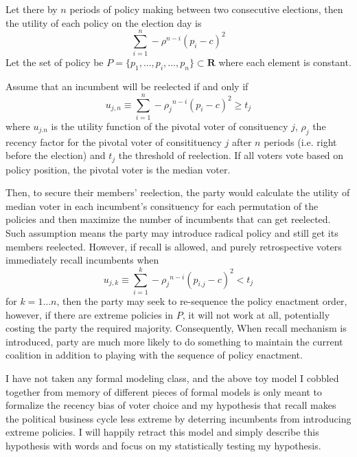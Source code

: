 \documentclass[hyphens, crop=false]{standalone}
\begin{document}
	Let there by $n$ periods of policy making between two consecutive elections, then the utility of each policy on the election day is
	$$
	\sum_{i = 1}^{n} -\rho^{n-i}( p_i-c)^2
	$$
	Let the set of policy be $P = \{p_1, \dots, p_i, \dots, p_n\}\subset \mathbf{R}$ where each element is constant.
	
	Assume that an incumbent will be reelected if and only if 
	$$
	u_{j, n} \equiv \sum_{i = 1}^{n} -{\rho_j}^{n-i}( p_{i}-c)^2 \geq t_j 
	$$
	where $u_{j.n}$ is the utility function of the pivotal voter of consituency $j$,
	$\rho_j$ the recency factor for the pivotal voter of consitituency $j$
	after $n$ periods (i.e. right before the election) and $t_j$ the threshold of reelection. If all voters vote based on policy position, the pivotal voter is the median voter.
	
	Then, to secure their members' reelection,
	the party would
	calculate the utility of median voter in each incumbent's consituency
	for each permutation of the policies and then
	maximize the number of incumbents that can get reelected.
	Such assumption means the party may introduce radical policy and still get its members reelected.
	However, if recall is allowed,
	and purely retrospective voters immediately recall incumbents when
	$$
	u_{j, k} \equiv \sum_{i = 1}^{k} -{\rho_j}^{n-i}( p_{i.j}-c)^2 < t_j 
	$$
	for $k = 1\dots n$,
	then
	the party may seek to re-sequence the policy enactment order,
	however, if there are extreme policies in $P$, it will not work at all,
	potentially costing the party the required majority.
	Consequently,
	When recall mechanism is introduced,
	party are much more likely to do something to maintain the current coalition in addition to playing with the sequence of policy enactment.
	
	I have not taken any formal modeling class,
	and the above toy model I cobbled together from memory of different pieces of formal models
	is only meant to formalize the recency bias of voter choice and my
	hypothesis that
	recall makes the political business cycle
	less extreme by deterring incumbents from introducing extreme policies.
	I will happily retract this model and simply
	describe this hypothesis with words and focus on my statistically testing my hypothesis.
	
	
	
\end{document}
